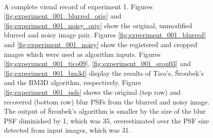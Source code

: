 \documentclass[12pt,notitlepage]{report}
\begin{document}
\begin{figure}[t]
	  ~
	  ~
  \caption[A complete visual record of experiment 1]{A complete visual record of experiment 1. Figures \ref{fig:experiment_001_blurred_orig} and \ref{fig:experiment_001_noisy_orig} show the original, unmodified blurred and noisy image pair. Figures \ref{fig:experiment_001_blurred} and \ref{fig:experiment_001_noisy} show the registered and cropped images which were used as algorithm inputs. Figures \ref{fig:experiment_001_tico09}, \ref{fig:experiment_001_srou03} and \ref{fig:experiment_001_bm3d} display the results of Tico's, Šroubek's and the BM3D algorithm, respectively. Figure \ref{fig:experiment_001_psfs} shows the original (top row) and recovered (bottom row) blur PSFs from the blurred and noisy image. The output of Šroubek's algorithm is smaller by the size of the blur PSF diminished by 1, which was 35, overestimated over the PSF size detected from input images, which was 31.} 
  \label{fig:experiment_001_complete}
\end{figure}
\end{document}
